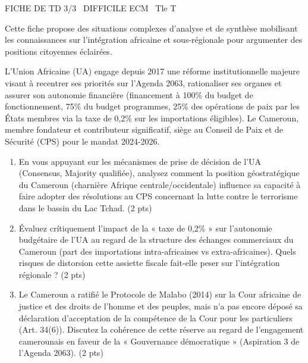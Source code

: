 \documentclass[11pt]{article}
\begin{document}
\begin{tcolorbox}[enhanced,colback=popink,colframe=popink,arc=10pt,boxrule=0pt,left=12pt,right=12pt,top=9pt,bottom=9pt]
{\color{white}\popxbold\small FICHE DE TD 3/3 \textbullet\ DIFFICILE \hfill ECM \textbullet\ Tle T\par}
\end{tcolorbox}
\vspace{4pt}
Cette fiche propose des situations complexes d'analyse et de synthèse mobilisant les connaissances sur l'intégration africaine et sous-régionale pour argumenter des positions citoyennes éclairées.

\begin{exercice}
L'Union Africaine (UA) engage depuis 2017 une réforme institutionnelle majeure visant à recentrer ses priorités sur l'Agenda 2063, rationaliser ses organes et assurer son autonomie financière (financement à 100\% du budget de fonctionnement, 75\% du budget programmes, 25\% des opérations de paix par les États membres via la taxe de 0,2\% sur les importations éligibles). Le Cameroun, membre fondateur et contributeur significatif, siège au Conseil de Paix et de Sécurité (CPS) pour le mandat 2024-2026.
\begin{enumerate}
    \item En vous appuyant sur les mécanismes de prise de décision de l'UA (Consensus, Majority qualifiée), analysez comment la position géostratégique du Cameroun (charnière Afrique centrale/occidentale) influence sa capacité à faire adopter des résolutions au CPS concernant la lutte contre le terrorisme dans le bassin du Lac Tchad. (2 pts)
    \item Évaluez crítiquement l'impact de la « taxe de 0,2\% » sur l'autonomie budgétaire de l'UA au regard de la structure des échanges commerciaux du Cameroun (part des importations intra-africaines vs extra-africaines). Quels risques de distorsion cette assiette fiscale fait-elle peser sur l'intégration régionale ? (2 pts)
    \item Le Cameroun a ratifié le Protocole de Malabo (2014) sur la Cour africaine de justice et des droits de l'homme et des peuples, mais n'a pas encore déposé sa déclaration d'acceptation de la compétence de la Cour pour les particuliers (Art. 34(6)). Discutez la cohérence de cette réserve au regard de l'engagement camerounais en faveur de la « Gouvernance démocratique » (Aspiration 3 de l'Agenda 2063). (2 pts)
\end{enumerate}
\end{exercice}
\end{document}

